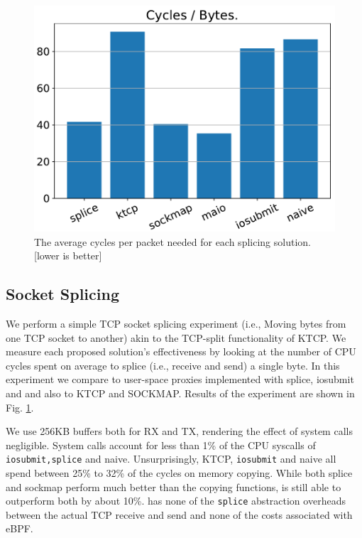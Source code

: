 \begin{figure}[t]
    \centering
    \includegraphics[width=\columnwidth]{splice.pdf}
    \caption{The average cycles per packet needed for each splicing solution. [lower is better]}
    \label{fig:cyc_byte}
\end{figure}

\subsection{Socket Splicing}
We perform a simple TCP socket splicing experiment (i.e., Moving bytes from one TCP socket to another) akin to the TCP-split functionality of KTCP. We measure each proposed solution's effectiveness by looking at the number of CPU cycles spent on average to splice (i.e., receive and send) a single byte. In this experiment we compare \oursys to user-space proxies implemented with splice\cite{splice}, iosubmit\cite{cloudflare_aio} and \sockets and also to KTCP\cite{ktcp} and SOCKMAP\cite{sockmap}. Results of the experiment are shown in Fig. \ref{fig:cyc_byte}.

We use 256KB buffers both for RX and TX, rendering the effect of system calls negligible. System calls account for less than 1\% of the CPU syscalls of \texttt{iosubmit,splice} and naive. Unsurprisingly, KTCP, \texttt{iosubmit} and naive all spend between 25\% to 32\% of the cycles on memory copying. While both splice and sockmap perform much better than the copying functions, \oursys is still able to outperform both by about 10\%. \oursys has none of the \texttt{splice} abstraction overheads between the actual TCP receive and send and none of the costs associated with eBPF. 

